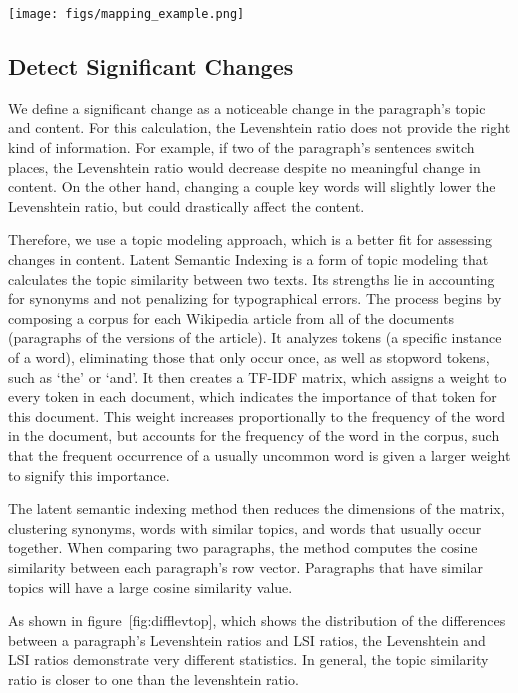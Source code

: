 \texttt{[image: figs/mapping\_example.png]}\\

\subsection{Detect Significant
Changes}\label{detect-significant-changes}

We define a significant change as a noticeable change in the paragraph's
topic and content. For this calculation, the Levenshtein ratio does not
provide the right kind of information. For example, if two of the
paragraph's sentences switch places, the Levenshtein ratio would
decrease despite no meaningful change in content. On the other hand,
changing a couple key words will slightly lower the Levenshtein ratio,
but could drastically affect the content.

Therefore, we use a topic modeling approach, which is a better fit for
assessing changes in content. Latent Semantic Indexing
\cite{deerwester1990indexing} is a form of topic modeling that
calculates the topic similarity between two texts. Its strengths lie in
accounting for synonyms and not penalizing for typographical errors. The
process begins by composing a corpus for each Wikipedia article from all
of the documents (paragraphs of the versions of the article). It
analyzes tokens (a specific instance of a word), eliminating those that
only occur once, as well as stopword tokens, such as `the' or `and'. It
then creates a TF-IDF matrix, which assigns a weight to every token in
each document, which indicates the importance of that token for this
document. This weight increases proportionally to the frequency of the
word in the document, but accounts for the frequency of the word in the
corpus, such that the frequent occurrence of a usually uncommon word is
given a larger weight to signify this importance.

The latent semantic indexing method then reduces the dimensions of the
matrix, clustering synonyms, words with similar topics, and words that
usually occur together. When comparing two paragraphs, the method
computes the cosine similarity between each paragraph's row vector.
Paragraphs that have similar topics will have a large cosine similarity
value.

As shown in figure~{[}fig:difflevtop{]}, which shows the distribution of
the differences between a paragraph's Levenshtein ratios and LSI ratios,
the Levenshtein and LSI ratios demonstrate very different statistics. In
general, the topic similarity ratio is closer to one than the
levenshtein ratio.

